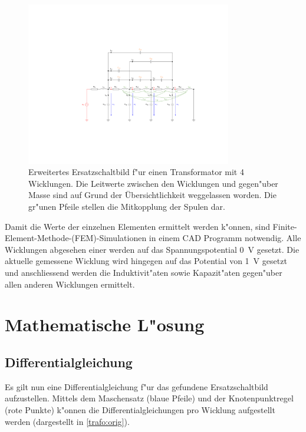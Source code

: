 \begin{refsection}
\begin{figure}
	\centering
	\includegraphics[width=0.8\textwidth]{./trafo/images/Trafo_Modell.pdf}
	\caption[Erweitertes Ersatzschaltbild f"ur einen Transformator]{Erweitertes Ersatzschaltbild f"ur einen Transformator mit 4 Wicklungen. Die Leitwerte zwischen den Wicklungen und gegen"uber Masse sind auf Grund der Übersichtlichkeit weggelassen worden. Die gr"unen Pfeile stellen die Mitkopplung der Spulen dar. }
	\label{trafo:erweitertes_ESB}
\end{figure}

Damit die Werte der einzelnen Elementen ermittelt werden k"onnen, sind Finite-Element-Methode-(FEM)-Simulationen in einem CAD Programm notwendig. Alle Wicklungen abgesehen einer werden auf das Spannungspotential \SI{0}{\volt} gesetzt. Die aktuelle gemessene Wicklung wird hingegen auf das Potential von \SI{1}{\volt} gesetzt und anschliessend werden die Induktivit"aten sowie Kapazit"aten gegen"uber allen anderen Wicklungen ermittelt.


\section{Mathematische L"osung}
\subsection{Differentialgleichung}

Es gilt nun eine Differentialgleichung f"ur das gefundene Ersatzschaltbild aufzustellen. Mittels dem Maschensatz (blaue Pfeile) und der Knotenpunktregel (rote Punkte) k"onnen die Differentialgleichungen pro Wicklung aufgestellt werden (dargestellt in \ref{trafo:orig}).


\end{refsection}
